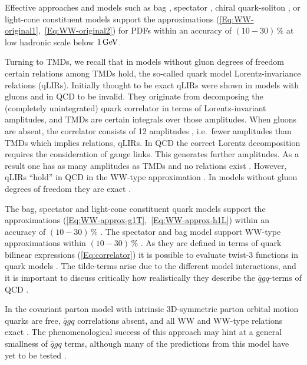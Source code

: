 \documentclass[a4paper,11pt]{article}
\begin{document}
Effective approaches and models such as bag 
\cite{Jaffe:1991ra,Stratmann:1993aw,Signal:1996ct,Avakian:2010br},
spectator \cite{Jakob:1997wg}, chiral quark-soliton 
\cite{Wakamatsu:2000ex}, or light-cone 
constituent \cite{Pasquini:2008ax,Lorce:2011dv} models
support the approximations (\ref{Eq:WW-original1},~\ref{Eq:WW-original2}) 
for PDFs within an accuracy of $(10-30)\,\%$ at low hadronic scale 
below $1\,{\rm GeV}$. 

Turning to TMDs, we recall that in models without gluon 
degrees of freedom certain relations among TMDs hold, the 
so-called quark model Lorentz-invariance relations (qLIRs).
Initially thought to be exact \cite{Tangerman:1994bb,Mulders:1995dh}
qLIRs were shown in models with gluons \cite{Kundu:2001pk,Schlegel:2004rg} 
and in QCD \cite{Goeke:2003az} to be invalid.
They originate from decomposing the (completely unintegrated)
quark correlator in terms of Lorentz-invariant amplitudes, and 
TMDs are certain integrals over those amplitudes.
When gluons are absent, the correlator consists
of 12 amplitudes \cite{Tangerman:1994bb,Mulders:1995dh}, i.e.\ fewer 
amplitudes than TMDs which implies relations, qLIRs. 
In QCD the correct Lorentz decomposition requires the consideration of 
gauge links. This generates further amplitudes. As a result one has 
as many amplitudes as TMDs and no relations exist \cite{Goeke:2003az}. 
However, qLIRs ``hold'' in QCD in the WW-type approximation 
\cite{Metz:2008ib}. In models without gluon degrees of freedom 
they are exact
\cite{Metz:2008ib,Teckentrup:2009tk,Avakian:2010br,Jakob:1997wg}. 

The bag, spectator and light-cone constituent quark models support 
the approximations (\ref{Eq:WW-approx-g1T},~\ref{Eq:WW-approx-h1L}) 
within an accuracy of $(10-30)\,\%$ 
\cite{Avakian:2010br,Jakob:1997wg,Lorce:2011dv,Pasquini:2008ax}.
The spectator and bag model support WW-type approximations 
within $(10-30)\,\%$ \cite{Avakian:2010br}. 
As they are defined in terms of quark bilinear expressions 
(\ref{Eq:correlator}) it is possible to evaluate twist-3 functions
in quark models \cite{Jaffe:1991ra}. The tilde-terms arise due to
the different model interactions, and it is important to discuss
critically how realistically they describe the $\bar{q}gq$-terms
of QCD \cite{Lorce:2014hxa,Lorce:2016ugb}.

In the covariant parton model with intrinsic 3D-symmetric parton 
orbital motion \cite{Zavada:1996kp}  quarks are free, $\bar qgq$ 
correlations absent, and all WW and WW-type relations exact
\cite{Efremov:2010mt,Efremov:2009ze}.
The phenomenological success of this approach \cite{Zavada:1996kp} may 
hint at a general smallness of $\bar qgq$ terms, although many of the 
predictions from this model have yet to be tested \cite{Efremov:2010mt}.
\end{document}
